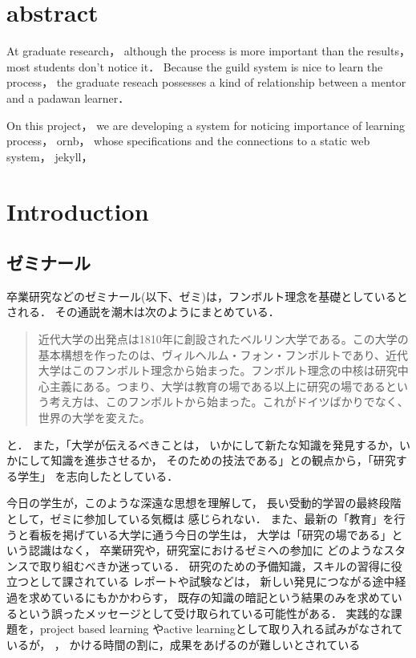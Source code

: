 \documentclass[a4,p11]{article}
\author{bob}
\date{}
\title{}
\begin{document}
\section{abstract}
\label{sec:org05ffce1}
At graduate research，
although the process is more important than the results，
most students don't notice it．
Because the guild system is nice to learn the process，
the graduate reseach possesses a kind of
relationship between
a mentor and a padawan learner．

On this project，
we are developing a system for
noticing importance of learning process，
ornb， whose specifications and
the connections to a static web system， jekyll，


\section{Introduction}
\label{sec:org3cbd641}
\subsection{ゼミナール}
\label{sec:org24d857a}
卒業研究などのゼミナール(以下、ゼミ)は，フンボルト理念を基礎としているとされる．
その通説を潮木は次のようにまとめている．
\begin{quote}
近代大学の出発点は1810年に創設されたベルリン大学である。この大学の基本構想を作ったのは、ヴィルヘルム・フォン・フンボルトであり、近代大学はこのフンボルト理念から始まった。フンボルト理念の中核は研究中心主義にある。つまり、大学は教育の場である以上に研究の場であるという考え方は、このフンボルトから始まった。これがドイツばかりでなく、世界の大学を変えた。
\cite{Ushiogi_column}
\end{quote}
と． また，「大学が伝えるべきことは，
いかにして新たな知識を発見するか，いかにして知識を進歩させるか，
そのための技法である」との観点から，「研究する学生」
を志向したとしている\cite{Ushiogi}．

今日の学生が，このような深遠な思想を理解して，
長い受動的学習の最終段階として，ゼミに参加している気概は
感じられない．
また、最新の「教育」を行うと看板を掲げている大学に通う今日の学生は，
大学は「研究の場である」という認識はなく，
卒業研究や，研究室におけるゼミへの参加に
どのようなスタンスで取り組むべきか迷っている．
研究のための予備知識，スキルの習得に役立つとして課されている
レポートや試験などは，
新しい発見につながる途中経過を求めているにもかかわらす，
既存の知識の暗記という結果のみを求めているという誤ったメッセージとして受け取られている可能性がある．
実践的な課題を，project based learning \cite{Bell}
やactive learningとして取り入れる試みがなされているが，
\cite{Settles}，\cite{溝上}
かける時間の割に，成果をあげるのが難しいとされている
\end{document}
